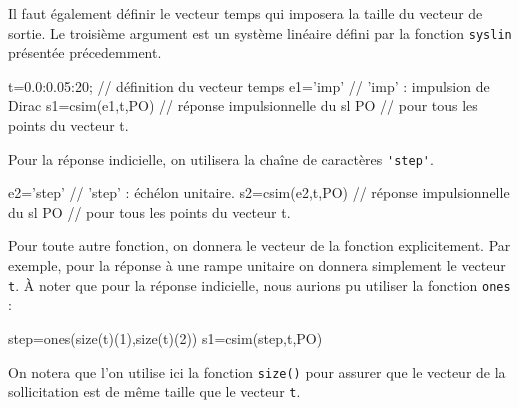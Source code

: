 Il faut également définir le vecteur temps qui imposera la 
taille du vecteur de sortie. Le troisième argument est un système linéaire
défini par la fonction \verb?syslin? présentée précedemment. 
\begin{Scilabcode}
t=0.0:0.05:20;             // définition du vecteur temps 
e1='imp'                   // 'imp' : impulsion de Dirac
s1=csim(e1,t,PO)           // réponse impulsionnelle du sl PO
                           // pour tous les points du vecteur t.
\end{Scilabcode}
Pour la réponse indicielle, on utilisera la chaîne de caractères \verb?'step'?.
\begin{Scilabcode}
e2='step'                  // 'step' : échélon unitaire.
s2=csim(e2,t,PO)           // réponse impulsionnelle du sl PO
                           // pour tous les points du vecteur t.
\end{Scilabcode}
Pour toute autre fonction, on donnera le vecteur de la fonction explicitement. 
Par exemple, pour la réponse à une rampe unitaire on donnera simplement 
le vecteur \verb?t?. \`A noter que pour la réponse indicielle, nous aurions 
pu utiliser la fonction \verb?ones? :
\begin{Scilabcode}
step=ones(size(t)(1),size(t)(2))
s1=csim(step,t,PO)
\end{Scilabcode}
On notera que l'on utilise ici la fonction \verb?size()? pour assurer que le 
vecteur de la sollicitation est de même taille que le vecteur \verb?t?. 
